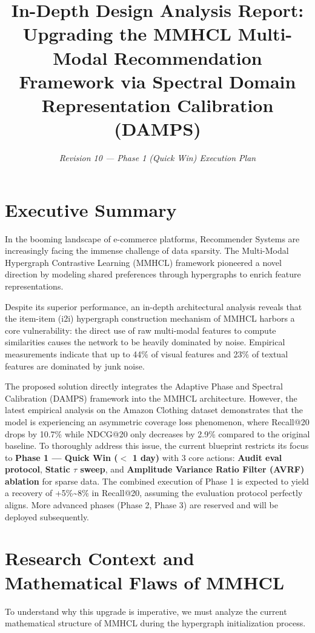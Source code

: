\documentclass[12pt, a4paper]{article}
\title{\textbf{In-Depth Design Analysis Report:\\Upgrading the MMHCL Multi-Modal Recommendation Framework via Spectral Domain Representation Calibration (DAMPS)}}
\author{\textit{Revision 10 — Phase 1 (Quick Win) Execution Plan}}
\date{}
\begin{document}
\maketitle

\section*{Executive Summary}
In the booming landscape of e-commerce platforms, Recommender Systems are increasingly facing the immense challenge of data sparsity. The Multi-Modal Hypergraph Contrastive Learning (MMHCL) framework pioneered a novel direction by modeling shared preferences through hypergraphs to enrich feature representations. 

Despite its superior performance, an in-depth architectural analysis reveals that the item-item (i2i) hypergraph construction mechanism of MMHCL harbors a core vulnerability: the direct use of raw multi-modal features to compute similarities causes the network to be heavily dominated by noise. Empirical measurements indicate that up to 44\% of visual features and 23\% of textual features are dominated by junk noise.

The proposed solution directly integrates the Adaptive Phase and Spectral Calibration (DAMPS) framework into the MMHCL architecture. However, the latest empirical analysis on the Amazon Clothing dataset demonstrates that the model is experiencing an asymmetric coverage loss phenomenon, where Recall@20 drops by 10.7\% while NDCG@20 only decreases by 2.9\% compared to the original baseline. To thoroughly address this issue, the current blueprint restricts its focus to \textbf{Phase 1 — Quick Win ($<$ 1 day)} with 3 core actions: \textbf{Audit eval protocol}, \textbf{Static $\tau$ sweep}, and \textbf{Amplitude Variance Ratio Filter (AVRF) ablation} for sparse data. The combined execution of Phase 1 is expected to yield a recovery of +5\%\textasciitilde8\% in Recall@20, assuming the evaluation protocol perfectly aligns. More advanced phases (Phase 2, Phase 3) are reserved and will be deployed subsequently.

\section{Research Context and Mathematical Flaws of MMHCL}
To understand why this upgrade is imperative, we must analyze the current mathematical structure of MMHCL during the hypergraph initialization process.
\end{document}
